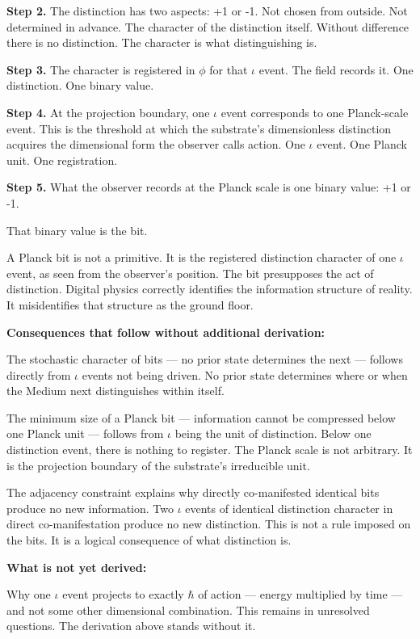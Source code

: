 \documentclass[11pt,letterpaper]{article}
\begin{document}
\textbf{Step 2.} The distinction has two aspects: +1 or -1. Not chosen from outside. Not determined in advance. The character of the distinction itself. Without difference there is no distinction. The character is what distinguishing is.

\textbf{Step 3.} The character is registered in \(\phi\) for that \(\iota\) event. The field records it. One distinction. One binary value.

\textbf{Step 4.} At the projection boundary, one \(\iota\) event corresponds to one Planck-scale event. This is the threshold at which the substrate's dimensionless distinction acquires the dimensional form the observer calls action. One \(\iota\) event. One Planck unit. One registration.

\textbf{Step 5.} What the observer records at the Planck scale is one binary value: +1 or -1.

That binary value is the bit.

A Planck bit is not a primitive. It is the registered distinction character of one \(\iota\) event, as seen from the observer's position. The bit presupposes the act of distinction. Digital physics correctly identifies the information structure of reality. It misidentifies that structure as the ground floor.

\textbf{Consequences that follow without additional derivation:}

The stochastic character of bits --- no prior state determines the next --- follows directly from \(\iota\) events not being driven. No prior state determines where or when the Medium next distinguishes within itself.

The minimum size of a Planck bit --- information cannot be compressed below one Planck unit --- follows from \(\iota\) being the unit of distinction. Below one distinction event, there is nothing to register. The Planck scale is not arbitrary. It is the projection boundary of the substrate's irreducible unit.

The adjacency constraint explains why directly co-manifested identical bits produce no new information. Two \(\iota\) events of identical distinction character in direct co-manifestation produce no new distinction. This is not a rule imposed on the bits. It is a logical consequence of what distinction is.

\textbf{What is not yet derived:}

Why one \(\iota\) event projects to exactly \(\hbar\) of action --- energy multiplied by time --- and not some other dimensional combination. This remains in unresolved questions. The derivation above stands without it.
\end{document}
